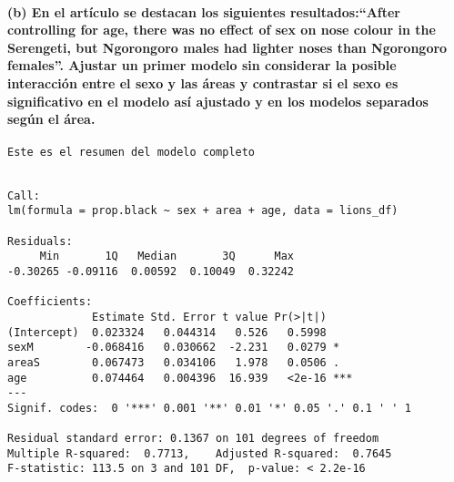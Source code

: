 \documentclass[
]{article}
\begin{document}
\hypertarget{b-en-el-artuxedculo-se-destacan-los-siguientes-resultadosafter-controlling-for-age-there-was-no-effect-of-sex-on-nose-colour-in-the-serengeti-but-ngorongoro-males-had-lighter-noses-than-ngorongoro-females.-ajustar-un-primer-modelo-sin-considerar-la-posible-interacciuxf3n-entre-el-sexo-y-las-uxe1reas-y-contrastar-si-el-sexo-es-significativo-en-el-modelo-asuxed-ajustado-y-en-los-modelos-separados-seguxfan-el-uxe1rea.}{%
\paragraph{\texorpdfstring{\textbf{(b) En el artículo se destacan los
siguientes resultados:``After controlling for age, there was no effect
of sex on nose colour in the Serengeti, but Ngorongoro males had lighter
noses than Ngorongoro females''. Ajustar un primer modelo sin considerar
la posible interacción entre el sexo y las áreas y contrastar si el sexo
es significativo en el modelo así ajustado y en los modelos separados
según el
área.}}{(b) En el artículo se destacan los siguientes resultados:``After controlling for age, there was no effect of sex on nose colour in the Serengeti, but Ngorongoro males had lighter noses than Ngorongoro females''. Ajustar un primer modelo sin considerar la posible interacción entre el sexo y las áreas y contrastar si el sexo es significativo en el modelo así ajustado y en los modelos separados según el área.}}\label{b-en-el-artuxedculo-se-destacan-los-siguientes-resultadosafter-controlling-for-age-there-was-no-effect-of-sex-on-nose-colour-in-the-serengeti-but-ngorongoro-males-had-lighter-noses-than-ngorongoro-females.-ajustar-un-primer-modelo-sin-considerar-la-posible-interacciuxf3n-entre-el-sexo-y-las-uxe1reas-y-contrastar-si-el-sexo-es-significativo-en-el-modelo-asuxed-ajustado-y-en-los-modelos-separados-seguxfan-el-uxe1rea.}}

\begin{verbatim}
Este es el resumen del modelo completo
\end{verbatim}

\begin{verbatim}

Call:
lm(formula = prop.black ~ sex + area + age, data = lions_df)

Residuals:
     Min       1Q   Median       3Q      Max 
-0.30265 -0.09116  0.00592  0.10049  0.32242 

Coefficients:
             Estimate Std. Error t value Pr(>|t|)    
(Intercept)  0.023324   0.044314   0.526   0.5998    
sexM        -0.068416   0.030662  -2.231   0.0279 *  
areaS        0.067473   0.034106   1.978   0.0506 .  
age          0.074464   0.004396  16.939   <2e-16 ***
---
Signif. codes:  0 '***' 0.001 '**' 0.01 '*' 0.05 '.' 0.1 ' ' 1

Residual standard error: 0.1367 on 101 degrees of freedom
Multiple R-squared:  0.7713,    Adjusted R-squared:  0.7645 
F-statistic: 113.5 on 3 and 101 DF,  p-value: < 2.2e-16
\end{verbatim}
\end{document}
